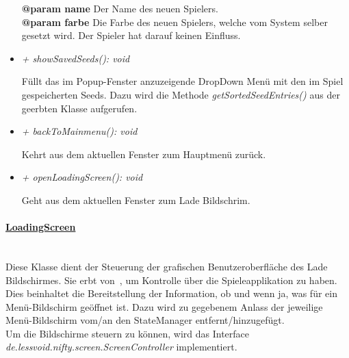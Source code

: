 \begin{itemize}
\begin{leftbar}[0.9\linewidth]
                        \textbf{@param name} Der Name des neuen Spielers.\\
                        \textbf{@param farbe} Die Farbe des neuen Spielers, welche 
                        vom System selber gesetzt wird. Der Spieler hat darauf 
                        keinen Einfluss.\\
                    \end{leftbar}
                \item  \textit{+ showSavedSeeds(): void} 
                    \begin{leftbar}[0.9\linewidth]
                        Füllt das im Popup-Fenster anzuzeigende DropDown Menü mit den im Spiel
                        gespeicherten Seeds. Dazu wird die Methode \textit{getSortedSeedEntries()} aus
                        der geerbten Klasse aufgerufen. \\
                    \end{leftbar}
                \item  \textit{+ backToMainmenu(): void} 
                    \begin{leftbar}[0.9\linewidth]
                        Kehrt aus dem aktuellen Fenster zum Hauptmenü zurück.\\
                    \end{leftbar}
                \item  \textit{+ openLoadingScreen(): void} 
                    \begin{leftbar}[0.9\linewidth]
                        Geht aus dem aktuellen Fenster zum Lade Bildschrim.\\
                    \end{leftbar}
            \end{itemize}

        \pagebreak
        \paragraph{\underline{LoadingScreen}} \mbox{}\\
        Diese Klasse dient der Steuerung der grafischen Benutzeroberfläche
        des Lade Bildschirmes. Sie erbt von~, um Kontrolle über die 
        Spieleapplikation zu haben. Dies beinhaltet  die Bereitstellung der
        Information, ob und wenn ja, was für ein Menü-Bildschirm geöffnet ist.
        Dazu wird zu gegebenem Anlass der jeweilige Menü-Bildschirm vom/an den
        StateManager entfernt/hinzugefügt.\\
        Um die Bildschirme steuern zu können, wird das Interface
        \textit{de.lessvoid.nifty.screen.ScreenController} implementiert. \par
            
